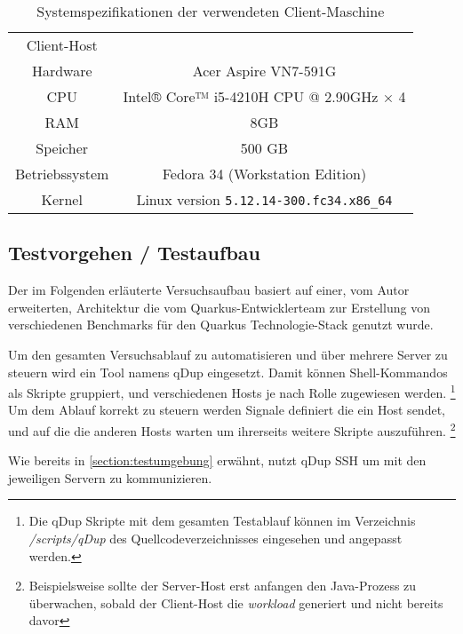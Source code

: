 \begin{table}[ht!]
	\centering
	\begin{tabular}{| c | c |}
		\hline
		Client-Host                                               \\
		Hardware       & Acer Aspire VN7-591G                     \\
		\hline
		CPU            & Intel® Core™ i5-4210H CPU @ 2.90GHz × 4  \\
		\hline
		RAM            & 8GB                                      \\
		\hline
		Speicher       & 500 GB                                   \\
		\hline
		Betriebssystem & Fedora 34 (Workstation Edition)          \\
		\hline
		Kernel         & Linux version \verb|5.12.14-300.fc34.x86_64| \\
		\hline
	\end{tabular}
	\caption{Systemspezifikationen der verwendeten Client-Maschine}
	\label{table:system_client}
\end{table}

\subsection{Testvorgehen / Testaufbau}
\label{section:vorgehen}
Der im Folgenden erläuterte Versuchsaufbau basiert auf einer, vom Autor erweiterten, Architektur die vom Quarkus-Entwicklerteam
zur Erstellung von verschiedenen Benchmarks für den Quarkus Technologie-Stack genutzt wurde.
\parencite{QuarkusBlog, QuarkusJohnaohara}

Um den gesamten Versuchsablauf zu automatisieren und über mehrere Server zu steuern wird ein Tool namens qDup eingesetzt.
Damit können Shell-Kommandos als Skripte gruppiert, und verschiedenen Hosts je nach Rolle zugewiesen werden.
\footnote{Die qDup Skripte mit dem gesamten Testablauf können im Verzeichnis \textit{/scripts/qDup} des Quellcodeverzeichnisses eingesehen und
	angepasst werden.}
Um dem Ablauf korrekt zu steuern werden Signale definiert die ein Host sendet, und auf die die anderen Hosts warten um ihrerseits
weitere Skripte auszuführen.
\footnote{Beispielsweise sollte der Server-Host erst anfangen den Java-Prozess zu überwachen, sobald der Client-Host die \textit{workload}
	generiert und nicht bereits davor}


Wie bereits in \ref{section:testumgebung} erwähnt, nutzt qDup SSH um mit den jeweiligen Servern zu kommunizieren.

